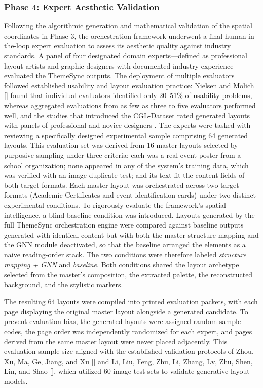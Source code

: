\begin{refsection}
\subsubsection{Phase 4: Expert Aesthetic Validation}
Following the algorithmic generation and mathematical validation of the spatial coordinates in Phase 3, the orchestration framework underwent a final human-in-the-loop expert evaluation to assess its aesthetic quality against industry standards. A panel of four designated domain experts—defined as professional layout artists and graphic designers with documented industry experience—evaluated the ThemeSync outputs. The deployment of multiple evaluators followed established usability and layout evaluation practice: Nielsen and Molich [\citeyear{nielsen1990heuristic}] found that individual evaluators identified only 20--51\% of usability problems, whereas aggregated evaluations from as few as three to five evaluators performed well, and the studies that introduced the CGL-Dataset rated generated layouts with panels of professional and novice designers \cite{zhou2022cglgan, li2023radm}. The experts were tasked with reviewing a specifically designed experimental sample comprising 64 generated layouts. This evaluation set was derived from 16 master layouts selected by purposive sampling \cite{etikan2016comparison} under three criteria: each was a real event poster from a school organization; none appeared in any of the system's training data, which was verified with an image-duplicate test; and its text fit the content fields of both target formats. Each master layout was orchestrated across two target formats (Academic Certificates and event identification cards) under two distinct experimental conditions. To rigorously evaluate the framework's spatial intelligence, a blind baseline condition was introduced. Layouts generated by the full ThemeSync orchestration engine were compared against baseline outputs generated with identical content but with both the master-structure mapping and the GNN module deactivated, so that the baseline arranged the elements as a naive reading-order stack. The two conditions were therefore labeled \textit{structure mapping + GNN} and \textit{baseline}. Both conditions shared the layout archetype selected from the master's composition, the extracted palette, the reconstructed background, and the stylistic markers.

The resulting 64 layouts were compiled into printed evaluation packets, with each page displaying the original master layout alongside a generated candidate. To prevent evaluation bias, the generated layouts were assigned random sample codes, the page order was independently randomized for each expert, and pages derived from the same master layout were never placed adjacently. This evaluation sample size aligned with the established validation protocols of Zhou, Xu, Ma, Ge, Jiang, and Xu [\citeyear{zhou2022cglgan}] and Li, Liu, Feng, Zhu, Li, Zhang, Lv, Zhu, Shen, Lin, and Shao [\citeyear{li2023radm}], which utilized 60-image test sets to validate generative layout models.


\end{refsection}
